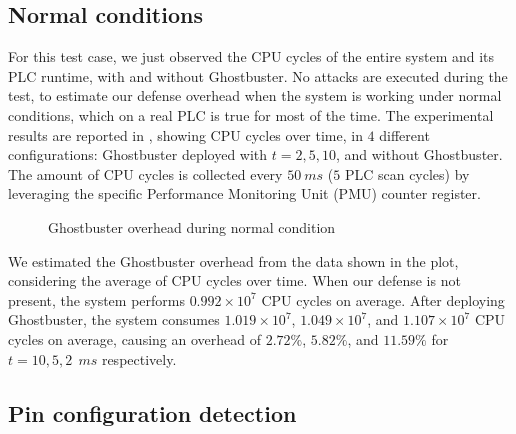 \subsection{Normal conditions}

For this test case, we just observed the CPU cycles of the entire system and its PLC runtime, with and without Ghostbuster.
No attacks are executed during the test, to estimate our defense overhead when the system is working under normal conditions,
which on a real PLC is true for most of the time.
The experimental results are reported in , showing CPU cycles over time, in $4$ different configurations:
Ghostbuster deployed with $t=2,5,10$, and without Ghostbuster. The amount of CPU cycles is collected every $\SI{50}{ms}$ ($5$ PLC scan cycles)
by leveraging the specific Performance Monitoring Unit (PMU) counter register.

\begin{figure}[h]
\centering
{}
\caption{Ghostbuster overhead during normal condition}
\label{fig:normal-overhead}
\end{figure}

We estimated the Ghostbuster overhead from the data shown in the plot, considering the average of CPU cycles over time.
When our defense is not present, the system performs $0.992 \times 10^{7}$ CPU cycles on average.
After deploying Ghostbuster, the system consumes $1.019 \times 10^{7}$, $1.049 \times 10^{7}$, and $1.107 \times 10^{7}$ CPU cycles on average,
causing an overhead of $2.72\%$, $5.82\%$, and $11.59\%$ for $t = 10,5,2~\SI{}{ms}$ respectively.


\subsection{Pin configuration detection}

